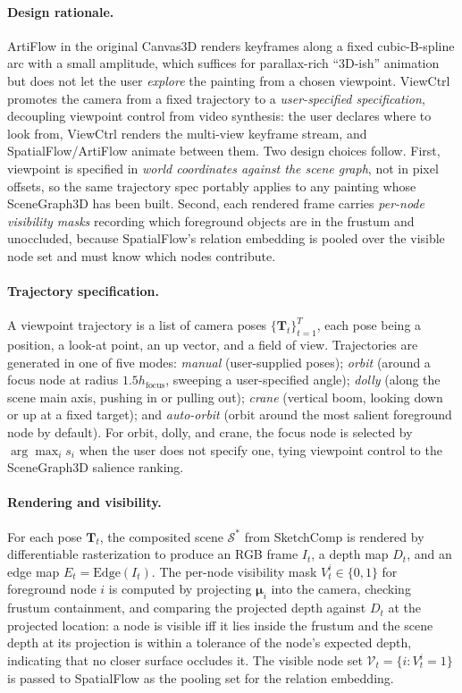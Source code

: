 \paragraph{Design rationale.}
ArtiFlow in the original Canvas3D renders keyframes along a fixed
cubic-B-spline arc with a small amplitude, which suffices for
parallax-rich ``3D-ish'' animation but does not let the user
\emph{explore} the painting from a chosen viewpoint. ViewCtrl promotes
the camera from a fixed trajectory to a \emph{user-specified
specification}, decoupling viewpoint control from video synthesis: the
user declares where to look from, ViewCtrl renders the multi-view
keyframe stream, and SpatialFlow/ArtiFlow animate between them. Two
design choices follow. First, viewpoint is specified in
\emph{world coordinates against the scene graph}, not in pixel offsets,
so the same trajectory spec portably applies to any painting whose
SceneGraph3D has been built. Second, each rendered frame carries
\emph{per-node visibility masks} recording which foreground objects are
in the frustum and unoccluded, because SpatialFlow's relation embedding
is pooled over the visible node set and must know which nodes
contribute.

\paragraph{Trajectory specification.}
A viewpoint trajectory is a list of camera poses
$\{\mathbf{T}_t\}_{t=1}^{T}$, each pose being a position, a look-at
point, an up vector, and a field of view. Trajectories are generated
in one of five modes:
\emph{manual} (user-supplied poses);
\emph{orbit} (around a focus node at radius $1.5 h_\text{focus}$,
sweeping a user-specified angle);
\emph{dolly} (along the scene main axis, pushing in or pulling out);
\emph{crane} (vertical boom, looking down or up at a fixed target); and
\emph{auto-orbit} (orbit around the most salient foreground node by
default). For orbit, dolly, and crane, the focus node is selected by
$\arg\max_i s_i$ when the user does not specify one, tying viewpoint
control to the SceneGraph3D salience ranking.

\paragraph{Rendering and visibility.}
For each pose $\mathbf{T}_t$, the composited scene $\mathcal{S}^*$
from SketchComp is rendered by differentiable rasterization to produce
an RGB frame $I_t$, a depth map $D_t$, and an edge map
$E_t = \text{Edge}(I_t)$. The per-node visibility mask
$V_t^i \in \{0,1\}$ for foreground node $i$ is computed by projecting
$\boldsymbol{\mu}_i$ into the camera, checking frustum containment,
and comparing the projected depth against $D_t$ at the projected
location: a node is visible iff it lies inside the frustum and the
scene depth at its projection is within a tolerance of the node's
expected depth, indicating that no closer surface occludes it. The
visible node set $\mathcal{V}_t = \{i : V_t^i = 1\}$ is passed to
SpatialFlow as the pooling set for the relation embedding.

